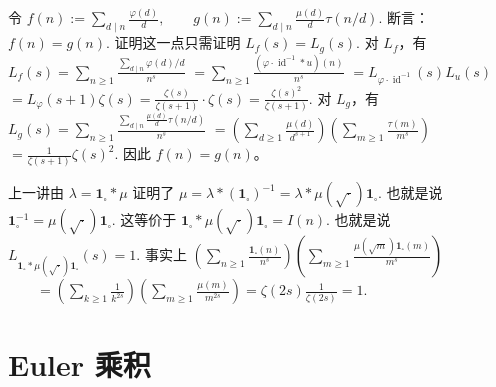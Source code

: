 \begin{example}
	令
	\(\textstyle f(n):=\allowbreak{}\sum_{d\mid\allowbreak{} n}\frac{\varphi(d)}{d},\allowbreak{} \qquad g(n):=\allowbreak{}\sum_{d\mid\allowbreak{} n}\frac{\mu(d)}{d}\tau(n/d).\)
	断言：
	\(\textstyle f(n)=\allowbreak{}g(n).\)
	证明这一点只需证明
	\(\textstyle L_f(s)=\allowbreak{}L_g(s).\)
	对 $L_f$，有
	\(\textstyle L_f(s) =\allowbreak{} \sum_{n\geq\allowbreak{} 1} \frac{\sum_{d\mid\allowbreak{} n}\varphi(d)/d}{n^s}\) \(\textstyle =\allowbreak{} \sum_{n\geq\allowbreak{} 1} \frac{(\varphi\cdot\operatorname{id}^{-1}*u)(n)}{n^s}\) \(\textstyle =\allowbreak{} L_{\varphi\cdot\operatorname{id}^{-1}}(s)L_u(s)\) \(\textstyle =\allowbreak{} L_\varphi(s+\allowbreak{}1)\zeta(s) =\allowbreak{} \frac{\zeta(s)}{\zeta(s+\allowbreak{}1)}\cdot\zeta(s) =\allowbreak{} \frac{\zeta(s)^2}{\zeta(s+\allowbreak{}1)}.\)
	对 $L_g$，有
	\(\textstyle L_g(s) =\allowbreak{} \sum_{n\geq\allowbreak{} 1} \frac{\sum_{d\mid\allowbreak{} n}\frac{\mu(d)}d\tau(n/d)}{n^s}\) \(\textstyle =\allowbreak{} \left(\sum_{d\geq\allowbreak{} 1}\frac{\mu(d)}{d^{s+\allowbreak{}1}}\right) \left(\sum_{m\geq\allowbreak{} 1}\frac{\tau(m)}{m^s}\right)\) \(\textstyle =\allowbreak{} \frac1{\zeta(s+\allowbreak{}1)}\zeta(s)^2.\)
	因此 $f(n)=g(n)$。
\end{example}

\begin{example}
	上一讲由 $\lambda=\mathbf 1_{\square}*\mu$ 证明了
	\(\textstyle \mu =\allowbreak{} \lambda*(\mathbf 1_{\square})^{-1} =\allowbreak{} \lambda*\mu(\sqrt{\cdot})\mathbf 1_{\square}.\)
	也就是说
	\(\textstyle \mathbf 1_{\square}^{-1} =\allowbreak{} \mu(\sqrt{\cdot})\mathbf 1_{\square}.\)
	这等价于
	\(\textstyle \mathbf 1_{\square}* \mu(\sqrt{\cdot})\mathbf 1_{\square} =\allowbreak{} I(n).\)
	也就是说
	\(\textstyle L_{\mathbf 1_{\square}*\mu(\sqrt{\cdot})\mathbf 1_{\square}}(s)=\allowbreak{}1.\)
	事实上
	\(\textstyle \left(\sum_{n\geq\allowbreak{} 1}\frac{\mathbf 1_{\square}(n)}{n^s}\right) \left(\sum_{m\geq\allowbreak{} 1} \frac{\mu(\sqrt m)\mathbf 1_{\square}(m)}{m^s}\right)\) \(\textstyle \qquad=\allowbreak{} \left(\sum_{k\geq\allowbreak{} 1}\frac1{k^{2s}}\right) \left(\sum_{m\geq\allowbreak{} 1}\frac{\mu(m)}{m^{2s}}\right) =\allowbreak{} \zeta(2s)\frac1{\zeta(2s)} =\allowbreak{} 1.\)
\end{example}

\section{Euler 乘积}

